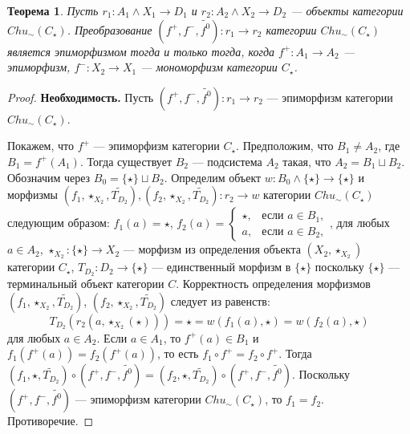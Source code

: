 \documentclass[a4paper,12pt]{article}
\newtheorem{theorem}{Теорема}
\newcommand{\fo}{\widetilde{f^0}}
\begin{document}
\begin{theorem}\label{epimorphism-c}
    Пусть $r_1: A_1 \wedge X_1 \to D_1$ и $r_2: A_2 \wedge X_2 \to D_2$ --- объекты категории $Chu_\sim(C_\star)$. Преобразование $(f^+,f^-,\fo): r_1 \to r_2$ категории $Chu_\sim(C_\star)$ является эпиморфизмом тогда и только тогда, когда $f^+: A_1 \to A_2$ --- эпиморфизм, $f^-: X_2 \to X_1$ --- мономорфизм категории $C_{\star}$.
\end{theorem}
\begin{proof}
    \textbf{Необходимость.} Пусть $(f^+,f^-,\fo): r_1 \to r_2$ --- эпиморфизм категории $Chu_\sim(C_\star)$.

    Покажем, что $f^+$ --- эпиморфизм категории $C_\star$. Предположим, что $B_1 \ne A_2$, где $B_1 = f^+(A_1)$. Тогда существует $B_2$ --- подсистема $A_2$ такая, что $A_2 = B_1 \sqcup B_2$. Обозначим через $B_0 = \{\star\} \sqcup B_2$. Определим объект $w: B_0 \wedge \{\star\} \to \{\star\}$ и морфизмы $(f_1,\star_{X_2},\widetilde{T_{D_2}}), (f_2,\star_{X_2},\widetilde{T_{D_2}}): r_2 \to w$ категории $Chu_\sim(C_\star)$ следующим образом: $f_1(a) = \star$, $f_2(a) = 
    \begin{cases}
        \star, & \text{если } a \in B_1,\\
        a, & \text{если } a \in B_2,
    \end{cases}$, для любых $a \in A_2$, $\star_{X_2}: \{\star\} \to X_2$ --- морфизм из определения объекта $(X_2,\star_{X_2})$ категории $C_\star$, $T_{D_2}: D_2 \to \{\star\}$ --- единственный морфизм в $\{\star\}$ поскольку $\{\star\}$ --- терминальный объект категории $C$. Корректность определения морфизмов $(f_1,\star_{X_2},\widetilde{T_{D_2}})$, $(f_2,\star_{X_2},\widetilde{T_{D_2}})$ следует из равенств:
    $$
        T_{D_2}(r_2(a,\star_{X_2}(\star))) = \star = w(f_1(a),\star) = w(f_2(a),\star)
    $$
    для любых $a \in A_2$. Если $a \in A_1$, то $f^+(a) \in B_1$ и $f_1(f^+(a)) = f_2(f^+(a))$, то есть $f_1 \circ f^+ = f_2 \circ f^+$. Тогда $(f_1,\star,\widetilde{T_{D_2}}) \circ (f^+,f^-,\fo) = (f_2,\star,\widetilde{T_{D_2}}) \circ (f^+,f^-,\fo)$. Поскольку $(f^+,f^-,\fo)$ --- эпиморфизм категории $Chu_\sim(C_\star)$, то $f_1 = f_2$. Противоречие.


\end{proof}
\end{document}
